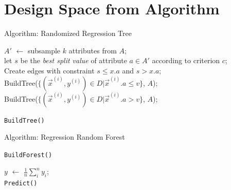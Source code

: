 \section{Design Space from Algorithm}
\begin{frame}[c]{Algorithm: Randomized Regression Tree}

\begin{algorithm}[H]
\BlankLine
{} {
}
 {
}
\pause
$A'$ $\leftarrow$ subsample $k$ attributes from $A$;\\
let $s$ be the \emph{best split value} of attribute $a \in A'$ according to criterion $c$;\\ 
\pause
Create edges with constraint $s \leq x.a$ and $s > x.a$;\\
BuildTree($\{ (\vec{x}^{(i)}, y^{(i)}) \in D | \vec{x}^{(i)}.a \leq v\}$, $A$);\\
BuildTree($\{ (\vec{x}^{(i)}, y^{(i)}) \in D | \vec{x}^{(i)}.a > v\}$, $A$);
	
\caption{\texttt{BuildTree()}}
\end{algorithm}

\end{frame}
\begin{frame}[c]{Algorithm: Regression Random Forest}

\begin{algorithm}[H]
\BlankLine

	
\caption{\texttt{BuildForest()}}
\end{algorithm}

\pause
\bigskip

\begin{algorithm}[H]
\BlankLine


$y$ $\leftarrow$ $\frac{1}{n}\sum_{i}^n y_i$;\\
	
\caption{\texttt{Predict()}}
\end{algorithm}


\end{frame}
